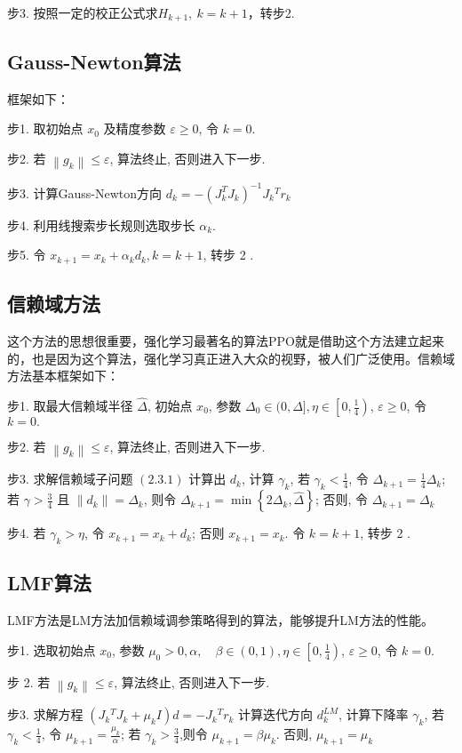 步3. 按照一定的校正公式求$H_{k+1},\ k = k + 1$，转步2. 
\subsection{Gauss-Newton算法}
框架如下：

步1. 取初始点 $x_{0}$ 及精度参数 $\varepsilon \geq 0$, 令 $k=0$.

步2. 若 $\left\|g_{k}\right\| \leq \varepsilon$, 算法终止, 否则进入下一步.

步3. 计算Gauss-Newton方向 $d_{k}=-\left(J_{k}^{T} J_{k}\right)^{-1} J_{k}{ }^{T} r_{k}$

步4. 利用线搜索步长规则选取步长 $\alpha_{k}$.

步5. 令 $x_{k+1}=x_{k}+\alpha_{k} d_{k}, k=k+1$, 转步 2 .
\subsection{信赖域方法}
这个方法的思想很重要，强化学习最著名的算法PPO就是借助这个方法建立起来的，也是因为这个算法，强化学习真正进入大众的视野，被人们广泛使用。信赖域方法基本框架如下：

步1. 取最大信赖域半径 $\hat{\Delta}$, 初始点 $x_{0}$, 参数 $\Delta_{0} \in(0, \hat{\Delta}], \eta \in\left[0, \frac{1}{4}\right)$, $\varepsilon \geq 0$, 令 $k=0 .$

步2. 若 $\left\|g_{k}\right\| \leq \varepsilon$, 算法终止, 否则进入下一步.

步3. 求解信赖域子问题 $(2.3 .1)$ 计算出 $d_{k}$, 计算 $\gamma_{k}$, 若 $\gamma_{k}<\frac{1}{4}$, 令 $\Delta_{k+1}=\frac{1}{4} \Delta_{k}$; 若 $\gamma>\frac{3}{4}$ 且 $\left\|d_{k}\right\|=\Delta_{k}$, 则令 $\Delta_{k+1}=\min \left\{2 \Delta_{k}, \hat{\Delta}\right\}$; 否则, 令 $\Delta_{k+1}=\Delta_{k}$

步4. 若 $\gamma_{k}>\eta$, 令 $x_{k+1}=x_{k}+d_{k}$; 否则 $x_{k+1}=x_{k}$. 令 $k=k+1$, 转步 2 .
\subsection{LMF算法}
LMF方法是LM方法加信赖域调参策略得到的算法，能够提升LM方法的性能。

步1. 选取初始点 $x_{0}$, 参数 $\mu_{0}>0, \alpha, \quad \beta \in(0,1), \eta \in\left[0, \frac{1}{4}\right)$, $\varepsilon \geq 0$, 令 $k=0 .$

步 2. 若 $\left\|g_{k}\right\| \leq \varepsilon$, 算法终止, 否则进入下一步.

步3. 求解方程 $\left(J_{k}{ }^{T} J_{k}+\mu_{k} I\right) d=-J_{k}{ }^{T} r_{k}$ 计算迭代方向 $d_{k}^{L M}$, 计算下降率 $\gamma_{k}$, 若 $\gamma_{k}<\frac{1}{4}$, 令 $\mu_{k+1}=\frac{\mu_{k}}{\alpha}$; 若 $\gamma_{k}>\frac{3}{4}$,则令 $\mu_{k+1}=\beta \mu_{k}$. 否则, $\mu_{k+1}=\mu_{k}$

